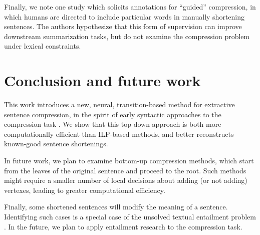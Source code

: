 \documentclass[11pt,a4paper]{article}
\begin{document}
Finally, we note one study \cite{Li2013DocumentSV} which solicits annotations for ``guided'' compression, in which humans are directed to include particular words in manually shortening sentences. The authors hypothesize that this form of supervision can improve downstream summarization tasks, but do not examine the compression problem under lexical constraints.

\section{Conclusion and future work}

This work introduces a new, neural, transition-based method for extractive sentence compression, in the spirit of early syntactic approaches to the compression task \cite{Jing2000SentenceRF,Knight2000StatisticsBasedS}. We show that this top-down approach is both more computationally efficient than ILP-based methods, and better reconstructs known-good sentence shortenings. 

In future work, we plan to examine bottom-up compression methods, which start from the leaves of the original sentence and proceed to the root. Such methods might require a smaller number of local decisions about adding (or not adding) vertexes, leading to greater computational efficiency.

Finally, some shortened sentences will modify the meaning of a sentence. Identifying such cases is a special case of the unsolved textual entailment problem \cite{snli_bowman,Pavlick2016SoCalledNA,linzencompression}. In the future, we plan to apply entailment research to the compression task.  



%



\end{document}
